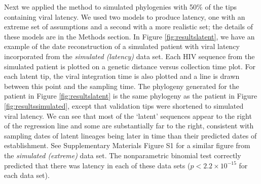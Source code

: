\documentclass{bmcart}
\begin{document}





Next we applied the method to simulated phylogenies with 50\% of the tips containing viral latency.
We used two models to produce latency, one with an extreme set of assumptions and a second with a more realistic set; the details of these models are in the Methods section.
In Figure \ref{fig:resultslatent}, we have an example of the date reconstruction of a simulated patient with viral latency incorporated from the \emph{simulated (latency)} data set.
Each HIV sequence from the simulated patient is plotted on a genetic distance versus collection time plot.
For each latent tip, the viral integration time is also plotted and a line is drawn between this point and the sampling time.
The phylogeny generated for the patient in Figure \ref{fig:resultslatent} is the same phylogeny as the patient in Figure \ref{fig:resultssimulated}, except that validation tips were shortened to simulated viral latency.
We can see that most of the `latent' sequences appear to the right of the regression line and some are substantially far to the right, consistent with sampling dates of latent lineages being later in time than their predicted dates of establishment.
See Supplementary Materials Figure S1 for a similar figure from the \emph{simulated (extreme)} data set.
The nonparametric binomial test correctly predicted that there was latency in each of these data sets ($p < 2.2 \times 10^{-15}$ for each data set).
\end{document}
